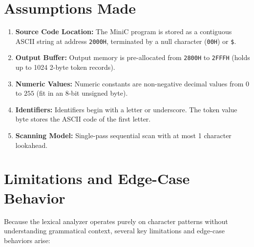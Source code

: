\documentclass[11pt,a4paper]{article}
\begin{document}
\section{Assumptions Made}
\begin{enumerate}[itemsep=2pt, topsep=2pt]
    \item \textbf{Source Code Location:} The MiniC program is stored as a contiguous ASCII string at address \texttt{2000H}, terminated by a null character (\texttt{00H}) or \texttt{\$}.
    \item \textbf{Output Buffer:} Output memory is pre-allocated from \texttt{2800H} to \texttt{2FFFH} (holds up to 1024 2-byte token records).
    \item \textbf{Numeric Values:} Numeric constants are non-negative decimal values from $0$ to $255$ (fit in an 8-bit unsigned byte).
    \item \textbf{Identifiers:} Identifiers begin with a letter or underscore. The token value byte stores the ASCII code of the first letter.
    \item \textbf{Scanning Model:} Single-pass sequential scan with at most 1 character lookahead.
\end{enumerate}

\section{Limitations and Edge-Case Behavior}
Because the lexical analyzer operates purely on character patterns without understanding grammatical context, several key limitations and edge-case behaviors arise:
\end{document}
